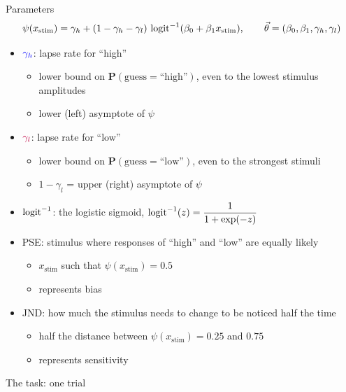 \begin{frame}{Parameters}
  \[
    \psi(x_\text{stim}) = \gamma_h + (1-\gamma_h-\gamma_l)\,
                          \operatorname{logit}^{-1}(\beta_0 + \beta_1 x_\text{stim}),
    \qquad \vec{\theta} = (\beta_0, \beta_1, \gamma_h, \gamma_l)
  \]
  \begin{itemize}
    \item ${\color{blue}\gamma_h}$: lapse rate for ``high''
    \begin{itemize}
      \item lower bound on $\mathbf{P}(\text{guess} = \text{``high''})$, even to the lowest stimulus amplitudes
      \item lower (left) asymptote of $\psi$
    \end{itemize}
    \item ${\color{purple}\gamma_l}$: lapse rate for ``low''
    \begin{itemize}
      \item lower bound on $\mathbf{P}(\text{guess} = \text{``low''})$, even to the strongest stimuli
      \item $1-\gamma_l$ = upper (right) asymptote of $\psi$
    \end{itemize}
    \item $\operatorname{logit}^{-1}$: the logistic sigmoid, $\operatorname{logit}^{-1}(z) = \dfrac{1}{1+\exp(-z)}$
    \item PSE: stimulus where responses of ``high'' and ``low'' are equally likely
    \begin{itemize}
      \item $x_\text{stim}$ such that $\psi(x_\text{stim}) = 0.5$
      \item represents bias
    \end{itemize}
    \item JND: how much the stimulus needs to change to be noticed half the time
    \begin{itemize}
      \item half the distance between $\psi(x_\text{stim}) = 0.25$ and $0.75$
      \item represents sensitivity
    \end{itemize}
  \end{itemize}
\end{frame}

\begin{frame}{The task: one trial}
  \centering
\end{frame}

